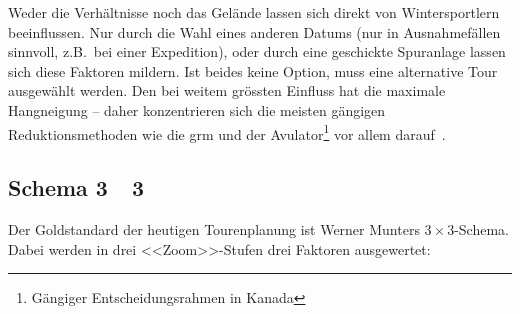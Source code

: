 Weder die Verhältnisse noch das Gelände lassen sich direkt von Wintersportlern beeinflussen. Nur durch die Wahl eines anderen Datums (nur in Ausnahmefällen sinnvoll, z.B.\ bei einer Expedition), oder durch eine geschickte Spuranlage lassen sich diese Faktoren mildern. 
Ist beides keine Option, muss eine alternative Tour ausgewählt werden.
Den bei weitem grössten Einfluss hat die maximale Hangneigung -- daher konzentrieren sich die meisten gängigen Reduktionsmethoden wie die \gls{grm} und der Avulator\footnote{Gängiger Entscheidungsrahmen in Kanada} vor allem darauf~\cite{arpddatasetdocs}\cite{harveyrhynerschweizerlawinenkunde}.

\subsection{Schema 3~\texttimes~3}
Der Goldstandard der heutigen Tourenplanung ist Werner Munters $3\times3$-Schema. Dabei werden in drei <<Zoom>>-Stufen drei Faktoren ausgewertet:



